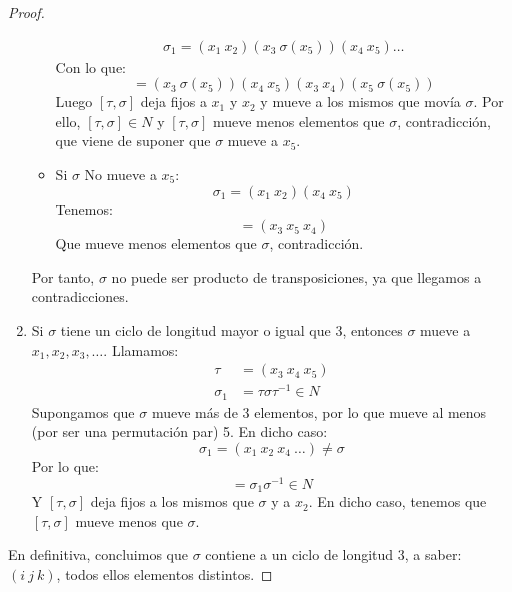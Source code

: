 \begin{teo}[de Abel]
\begin{proof}
\begin{enumerate}
\begin{itemize}
\begin{gather*}
                            \sigma_1 = (x_1\ x_2)(x_3\ \sigma(x_5))(x_4\ x_5)\ldots
                        \end{gather*}
                        Con lo que:
                        \begin{equation*}
                            [\tau, \sigma] = (x_3\ \sigma(x_5))(x_4\ x_5)(x_3\ x_4)(x_5\ \sigma(x_5))
                        \end{equation*}
                        Luego $[\tau, \sigma]$ deja fijos a $x_1$ y $x_2$ y mueve a los mismos que movía $\sigma$. Por ello, $[\tau, \sigma]\in N$ y $[\tau, \sigma]$ mueve menos elementos que $\sigma$, contradicción, que viene de suponer que $\sigma$ mueve a $x_5$.
                    \item Si $\sigma$ No mueve a $x_5$:
                        \begin{equation*}
                            \sigma_1 = (x_1\ x_2)(x_4\ x_5)
                        \end{equation*}
                        Tenemos:
                        \begin{equation*}
                            [\tau, \sigma] = (x_3\ x_5\ x_4)
                        \end{equation*}
                        Que mueve menos elementos que $\sigma$, contradicción.
                \end{itemize}
                Por tanto, $\sigma$ no puede ser producto de transposiciones, ya que llegamos a contradicciones.
            \item Si $\sigma$ tiene un ciclo de longitud mayor o igual que 3, entonces $\sigma$ mueve a $x_1, x_2, x_3, \ldots$. Llamamos:
                \begin{align*}
                    \tau &= (x_3\ x_4\ x_5) \\
                    \sigma_1 &= \tau \sigma \tau^{-1}  \in N
                \end{align*}
                Supongamos que $\sigma$ mueve más de 3 elementos, por lo que mueve al menos (por ser una permutación par) 5. En dicho caso:
                \begin{equation*}
                    \sigma_1 = (x_1\ x_2\ x_4\ \ldots) \neq \sigma
                \end{equation*}
                Por lo que:
                \begin{equation*}
                    [\tau, \sigma] = \sigma_1 \sigma^{-1} \in N
                \end{equation*}
                Y $[\tau, \sigma]$ deja fijos a los mismos que $\sigma$ y a $x_2$. En dicho caso, tenemos que $[\tau, \sigma]$ mueve menos que $\sigma$.
        \end{enumerate}
        En definitiva, concluimos que $\sigma$ contiene a un ciclo de longitud 3, a saber: $(i\ j\ k)$, todos ellos elementos distintos.


\end{proof}
\end{teo}
